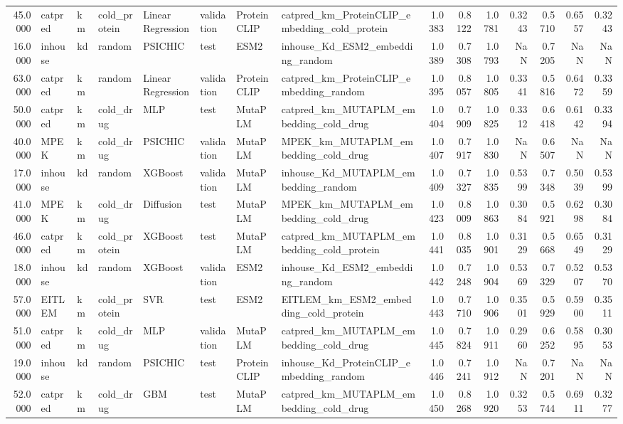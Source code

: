 \begin{tabular}{rlllllllrrrrrrr}
45.0000 & catpred & km & cold_protein & Linear Regression & validation & ProteinCLIP & catpred_km_ProteinCLIP_embedding_cold_protein & 1.0383 & 0.8122 & 1.0781 & 0.3243 & 0.5710 & 0.6557 & 0.3243 \\
16.0000 & inhouse & kd & random & PSICHIC & test & ESM2 & inhouse_Kd_ESM2_embedding_random & 1.0389 & 0.7308 & 1.0793 & NaN & 0.7205 & NaN & NaN \\
63.0000 & catpred & km & random & Linear Regression & validation & ProteinCLIP & catpred_km_ProteinCLIP_embedding_random & 1.0395 & 0.8057 & 1.0805 & 0.3341 & 0.5816 & 0.6472 & 0.3359 \\
50.0000 & catpred & km & cold_drug & MLP & test & MutaPLM & catpred_km_MUTAPLM_embedding_cold_drug & 1.0404 & 0.7909 & 1.0825 & 0.3312 & 0.6418 & 0.6142 & 0.3394 \\
40.0000 & MPEK & km & cold_drug & PSICHIC & validation & MutaPLM & MPEK_km_MUTAPLM_embedding_cold_drug & 1.0407 & 0.7917 & 1.0830 & NaN & 0.6507 & NaN & NaN \\
17.0000 & inhouse & kd & random & XGBoost & validation & MutaPLM & inhouse_Kd_MUTAPLM_embedding_random & 1.0409 & 0.7327 & 1.0835 & 0.5399 & 0.7348 & 0.5039 & 0.5399 \\
41.0000 & MPEK & km & cold_drug & Diffusion & test & MutaPLM & MPEK_km_MUTAPLM_embedding_cold_drug & 1.0423 & 0.8009 & 1.0863 & 0.3084 & 0.5921 & 0.6298 & 0.3084 \\
46.0000 & catpred & km & cold_protein & XGBoost & test & MutaPLM & catpred_km_MUTAPLM_embedding_cold_protein & 1.0441 & 0.8035 & 1.0901 & 0.3129 & 0.5668 & 0.6549 & 0.3129 \\
18.0000 & inhouse & kd & random & XGBoost & validation & ESM2 & inhouse_Kd_ESM2_embedding_random & 1.0442 & 0.7248 & 1.0904 & 0.5369 & 0.7329 & 0.5207 & 0.5370 \\
57.0000 & EITLEM & km & cold_protein & SVR & test & ESM2 & EITLEM_km_ESM2_embedding_cold_protein & 1.0443 & 0.7710 & 1.0906 & 0.3501 & 0.5929 & 0.5900 & 0.3511 \\
51.0000 & catpred & km & cold_drug & MLP & validation & MutaPLM & catpred_km_MUTAPLM_embedding_cold_drug & 1.0445 & 0.7824 & 1.0911 & 0.2960 & 0.6252 & 0.5895 & 0.3053 \\
19.0000 & inhouse & kd & random & PSICHIC & test & ProteinCLIP & inhouse_Kd_ProteinCLIP_embedding_random & 1.0446 & 0.7241 & 1.0912 & NaN & 0.7201 & NaN & NaN \\
52.0000 & catpred & km & cold_drug & GBM & test & MutaPLM & catpred_km_MUTAPLM_embedding_cold_drug & 1.0450 & 0.8268 & 1.0920 & 0.3253 & 0.5744 & 0.6911 & 0.3277 \\

\end{tabular}
